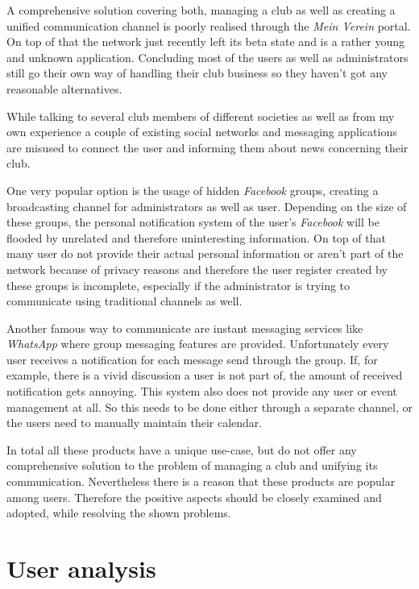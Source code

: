 A comprehensive solution covering both, managing a club as well as creating a unified communication channel is poorly realised through the \emph{Mein Verein} portal. On top of that the network just recently left its beta state and is a rather young and unknown application. Concluding most of the users as well as administrators still go their own way of handling their club business so they haven't got any reasonable alternatives.

While talking to several club members of different societies as well as from my own experience a couple of existing social networks and messaging applications are misused to connect the user and informing them about news concerning their club. 

One very popular option is the usage of hidden \emph{Facebook} groups, creating a broadcasting channel for administrators as well as user. Depending on the size of these groups, the personal notification system of the user's \emph{Facebook} will be flooded by unrelated and therefore uninteresting information. On top of that many user do not provide their actual personal information or aren't part of the network because of privacy reasons and therefore the user register created by these groups is incomplete, especially if the administrator is trying to communicate using traditional channels as well. 

Another famous way to communicate are instant messaging services like \emph{WhatsApp} where group messaging features are provided. Unfortunately every user receives a notification for each message send through the group. If, for example, there is a vivid discussion a user is not part of, the amount of received notification gets annoying. This system also does not provide any user or event management at all. So this needs to be done either through a separate channel, or the users need to manually maintain their calendar.

In total all these products have a unique use-case, but do not offer any comprehensive solution to the problem of managing a club and unifying its communication. Nevertheless there is a reason that these products are popular among users. Therefore the positive aspects should be closely examined and adopted, while resolving the shown problems.

\section{User analysis}
\label{sec:UserAnalysis}

